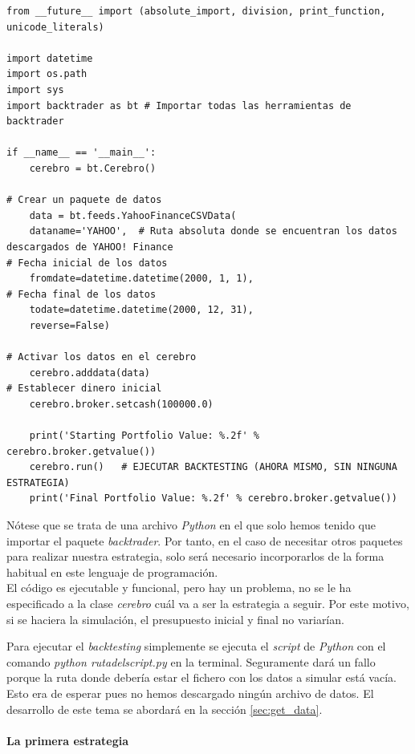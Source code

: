 		\begin{lstlisting}[basicstyle=\tiny]
from __future__ import (absolute_import, division, print_function, unicode_literals)
		
import datetime
import os.path
import sys
import backtrader as bt # Importar todas las herramientas de backtrader
		
if __name__ == '__main__':
	cerebro = bt.Cerebro()
		
# Crear un paquete de datos
	data = bt.feeds.YahooFinanceCSVData(
	dataname='YAHOO',  # Ruta absoluta donde se encuentran los datos descargados de YAHOO! Finance
# Fecha inicial de los datos
	fromdate=datetime.datetime(2000, 1, 1),
# Fecha final de los datos
	todate=datetime.datetime(2000, 12, 31),
	reverse=False)
		
# Activar los datos en el cerebro
	cerebro.adddata(data)
# Establecer dinero inicial    
	cerebro.broker.setcash(100000.0)
		
	print('Starting Portfolio Value: %.2f' % cerebro.broker.getvalue())
	cerebro.run()   # EJECUTAR BACKTESTING (AHORA MISMO, SIN NINGUNA ESTRATEGIA)
	print('Final Portfolio Value: %.2f' % cerebro.broker.getvalue())
		\end{lstlisting}
		
		\vspace{0.5cm}
		
		N\'otese que se trata de una archivo \textit{Python} en el que solo hemos tenido que importar el paquete \textit{backtrader}. Por tanto, en el caso de necesitar otros paquetes para realizar nuestra estrategia, solo ser\'a necesario incorporarlos de la forma habitual en este lenguaje de programaci\'on.\\
		
		El c\'odigo es ejecutable y funcional, pero hay un problema, no se le ha especificado a la clase \textit{cerebro} cu\'al va a ser la estrategia a seguir. Por este motivo, si se haciera la simulaci\'on, el presupuesto inicial y final no variar\'ian. 
		
		Para ejecutar el \textit{backtesting} simplemente se ejecuta el \textit{script} de \textit{Python} con el comando \textit{python rutadelscript.py} en la terminal. Seguramente dar\'a un fallo porque la ruta donde deber\'ia estar el fichero con los datos a simular est\'a vac\'ia. Esto era de esperar pues no hemos descargado ning\'un archivo de datos. El desarrollo de este tema se abordar\'a en la secci\'on \ref{sec:get_data}.
		
		
		\paragraph{La primera estrategia}
		

